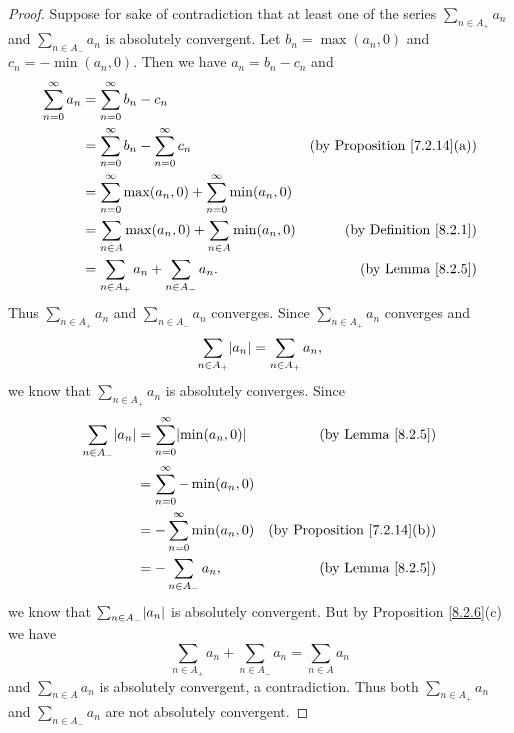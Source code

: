 \begin{proof}
    Suppose for sake of contradiction that at least one of the series \(\sum_{n \in A_+} a_n\) and \(\sum_{n \in A_-} a_n\) is absolutely convergent.
    Let \(b_n = \max(a_n, 0)\) and \(c_n = -\min(a_n, 0)\).
    Then we have \(a_n = b_n - c_n\) and
    \begin{align*}
        \sum_{n = 0}^\infty a_n & = \sum_{n = 0}^\infty b_n - c_n                                                                                 \\
                                & = \sum_{n = 0}^\infty b_n - \sum_{n = 0}^\infty c_n                   & \text{(by Proposition \ref{7.2.14}(a))} \\
                                & = \sum_{n = 0}^\infty \max(a_n, 0) + \sum_{n = 0}^\infty \min(a_n, 0)                                           \\
                                & = \sum_{n \in A} \max(a_n, 0) + \sum_{n \in A} \min(a_n, 0)           & \text{(by Definition \ref{8.2.1})}      \\
                                & = \sum_{n \in A_+} a_n + \sum_{n \in A_-} a_n.                        & \text{(by Lemma \ref{8.2.5})}
    \end{align*}
    Thus \(\sum_{n \in A_+} a_n\) and \(\sum_{n \in A_-} a_n\) converges.
    Since \(\sum_{n \in A_+} a_n\) converges and
    \[
        \sum_{n \in A_+} \abs*{a_n} = \sum_{n \in A_+} a_n,
    \]
    we know that \(\sum_{n \in A_+} a_n\) is absolutely converges.
    Since
    \begin{align*}
        \sum_{n \in A_-} \abs*{a_n} & = \sum_{n = 0}^\infty \abs*{\min(a_n, 0)} & \text{(by Lemma \ref{8.2.5})}           \\
                                    & = \sum_{n = 0}^\infty -\min(a_n, 0)                                                 \\
                                    & = -\sum_{n = 0}^\infty \min(a_n, 0)       & \text{(by Proposition \ref{7.2.14}(b))} \\
                                    & = -\sum_{n \in A_-} a_n,                  & \text{(by Lemma \ref{8.2.5})}
    \end{align*}
    we know that \(\sum_{n \in A_-} \abs*{a_n}\) is absolutely convergent.
    But by Proposition \ref{8.2.6}(c) we have
    \[
        \sum_{n \in A_+} a_n + \sum_{n \in A_-} a_n = \sum_{n \in A} a_n
    \]
    and \(\sum_{n \in A} a_n\) is absolutely convergent, a contradiction.
    Thus both \(\sum_{n \in A_+} a_n\) and \(\sum_{n \in A_-} a_n\) are not absolutely convergent.
\end{proof}

